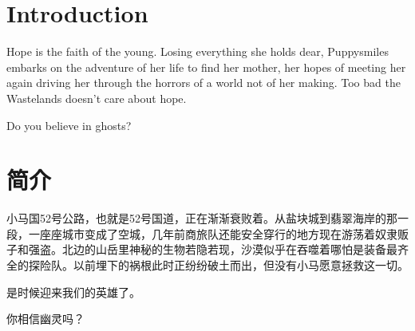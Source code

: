 \chapter{Introduction}

Hope is the faith of the young. Losing everything she holds dear, Puppysmiles embarks on the adventure of her life to find her mother, her hopes of meeting her again driving her through the horrors of a world not of her making. Too bad the Wastelands doesn't care about hope.

\clearpage

\begin{motto}
Do you believe in ghosts?
\end{motto}


\chapter{简介}

小马国52号公路，也就是52号国道，正在渐渐衰败着。从盐块城到翡翠海岸的那一段，一座座城市变成了空城，几年前商旅队还能安全穿行的地方现在游荡着奴隶贩子和强盗。北边的山岳里神秘的生物若隐若现，沙漠似乎在吞噬着哪怕是装备最齐全的探险队。以前埋下的祸根此时正纷纷破土而出，但没有小马愿意拯救这一切。

是时候迎来我们的英雄了。

\clearpage

\begin{motto}
你相信幽灵吗？
\end{motto}


